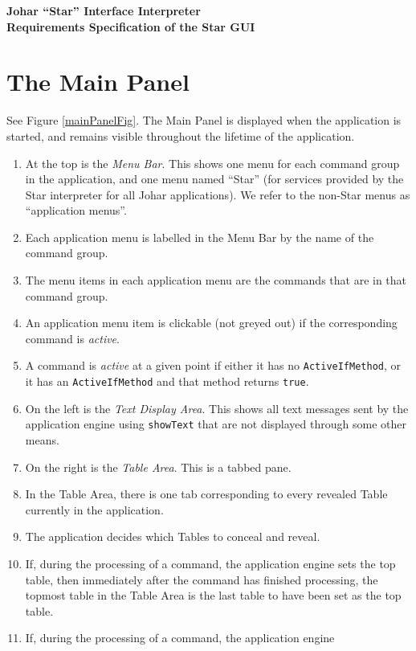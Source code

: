 \documentclass[11pt]{article}
\begin{document}
\begin{center} \bf \Large
Johar ``Star'' Interface Interpreter \\
Requirements Specification of the Star GUI
\end{center}

\section{The Main Panel}

See Figure \ref{mainPanelFig}.  The Main Panel is displayed when the
application is started, and remains visible throughout the lifetime of the
application.
\begin{enumerate}
\item At the top is the {\it Menu Bar}.  This shows one menu
  for each command group in the application, and one menu named
  ``Star'' (for services provided by the Star interpreter for all
  Johar applications).  We refer to the non-Star menus as ``application
  menus''.
\item Each application menu is labelled in the Menu Bar by the name of the
  command group.
\item The menu items in each application menu are the commands that are in
  that command group.
\item An application menu item is clickable (not greyed out) if the corresponding
  command is {\it active}.
\item A command is {\it active} at a given point if either it has no
  {\tt ActiveIfMethod}, or it has an {\tt ActiveIfMethod} and that
  method returns {\tt true}.
\item On the left is the {\it Text Display Area}.  This shows all
  text messages sent by the application engine using {\tt showText}
  that are not displayed through some other means.
\item On the right is the {\it Table Area}.  This is a tabbed pane.
\item In the Table Area, there is one tab corresponding to every
  revealed Table currently in the application.
\item The application decides which Tables to conceal and reveal.
\item If, during the processing of a command, the application engine sets
  the top table, then immediately after the command has finished
  processing, the topmost table in the Table Area is the last table to
  have been set as the top table.
\item If, during the processing of a command, the application engine

\end{enumerate}
\end{document}
